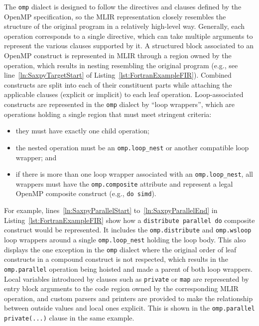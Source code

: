 \documentclass[acmtog,natbib=false]{acmart}
\newcommand{\code}[1]{\texttt{#1}\xspace}
\begin{document}
The \code{omp} dialect is designed to follow the directives and clauses defined by the OpenMP specification, so the \ac{MLIR} representation closely resembles the structure of the original program in a relatively high-level way.
Generally, each operation corresponds to a single directive, which can take multiple arguments to represent the various clauses supported by it.
A structured block associated to an OpenMP construct is represented in \ac{MLIR} through a region owned by the operation, which results in nesting resembling the original program (e.g., see line~\ref{ln:SaxpyTargetStart} of Listing~\ref{lst:FortranExampleFIR}).
Combined constructs are split into each of their constituent parts while attaching the applicable clauses (explicit or implicit) to each leaf operation.
Loop-associated constructs are represented in the \code{omp} dialect by ``loop wrappers'', which are operations holding a single region that must meet stringent criteria:

\begin{itemize}
    \item they must have exactly one child operation;
    \item the nested operation must be an \code{omp.loop\_nest} or another compatible loop wrapper; and
    \item if there is more than one loop wrapper associated with an \code{omp.loop\_nest}, all wrappers must have the \code{omp.composite} attribute and represent a legal OpenMP composite construct (e.g., \code{do simd}).
\end{itemize}

For example, lines~\ref{ln:SaxpyParallelStart} to~\ref{ln:SaxpyParallelEnd} in Listing~\ref{lst:FortranExampleFIR} show how a \code{distribute parallel do} composite construct would be represented.
It includes the \code{omp.distribute} and \code{omp.wsloop} loop wrappers around a single \code{omp.loop\_nest} holding the loop body.
This also displays the one exception in the \code{omp} dialect where the original order of leaf constructs in a compound construct is not respected, which results in the \code{omp.parallel} operation being hoisted and made a parent of both loop wrappers.
Local variables introduced by clauses such as \code{private} or \code{map} are represented by entry block arguments to the code region owned by the corresponding \ac{MLIR} operation, and custom parsers and printers are provided to make the relationship between outside values and local ones explicit.
This is shown in the \code{omp.parallel private(...)} clause in the same example.
\end{document}
